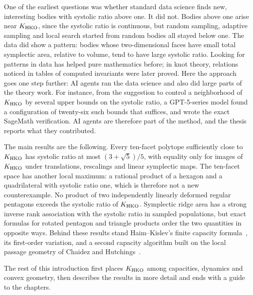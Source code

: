 One of the earliest questions was whether standard data science finds new,
interesting bodies with systolic ratio above one. It did not. Bodies above one
arise near $K_{\rm HKO}$, since the systolic ratio is continuous, but random
sampling, adaptive sampling and local search started from random bodies all
stayed below one. The data did show a pattern: bodies whose two-dimensional
faces have small total symplectic area, relative to volume, tend to have large
systolic ratio. Looking for patterns in data has helped pure mathematics
before; in knot theory, relations noticed in tables of computed invariants
were later proved. Here the approach goes one step further: AI agents ran the
data science and also did large parts of the theory work. For instance, from
the suggestion to control a neighborhood of $K_{\rm HKO}$ by several upper
bounds on the systolic ratio, a GPT-5-series model found a configuration of
twenty-six such bounds that suffices, and wrote the exact SageMath
verification. AI agents are therefore part of the method, and the thesis
reports what they contributed.

The main results are the following. Every ten-facet polytope sufficiently close
to $K_{\rm HKO}$ has systolic ratio at most $(3+\sqrt5)/5$, with equality only
for images of $K_{\rm HKO}$ under translations, rescalings and linear
symplectic maps. The ten-facet space has another local maximum: a rational
product of a hexagon and a quadrilateral with systolic ratio one, which is
therefore not a new counterexample. No product of two independently linearly
deformed regular pentagons exceeds the systolic ratio of $K_{\rm HKO}$.
Symplectic ridge area has a strong inverse rank association with the systolic
ratio in sampled populations, but exact formulas for rotated pentagon and
triangle products order the two quantities in opposite ways. Behind these
results stand Haim--Kislev's finite capacity formula~\cite{HK2017}, its
first-order variation, and a second capacity algorithm built on the local
passage geometry of Chaidez and Hutchings~\cite{CH2021}.

The rest of this introduction first places $K_{\rm HKO}$ among capacities,
dynamics and convex geometry, then describes the results in more detail and
ends with a guide to the chapters.
